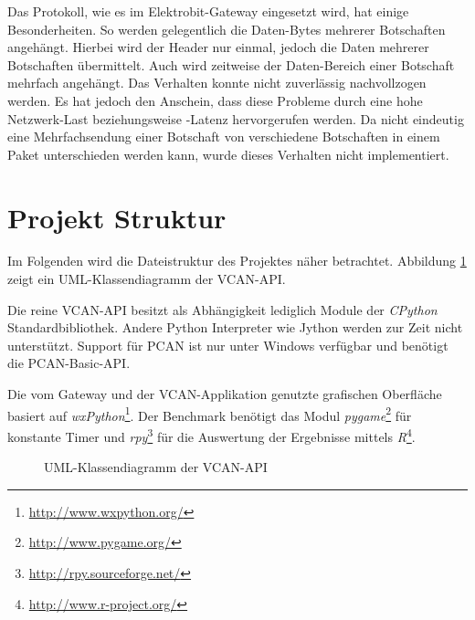 Das Protokoll, wie es im Elektrobit-Gateway eingesetzt wird, hat einige Besonderheiten. So werden gelegentlich die Daten-Bytes mehrerer Botschaften angehängt. Hierbei wird der Header nur einmal, jedoch die Daten mehrerer Botschaften übermittelt. Auch wird zeitweise der Daten-Bereich einer Botschaft mehrfach angehängt. Das Verhalten konnte nicht zuverlässig nachvollzogen werden. Es hat jedoch den Anschein, dass diese Probleme durch eine hohe Netzwerk-Last beziehungsweise -Latenz hervorgerufen werden. Da nicht eindeutig eine Mehrfachsendung einer Botschaft von verschiedene Botschaften in einem Paket unterschieden werden kann, wurde dieses Verhalten nicht implementiert. 


\section{Projekt Struktur}
\label{sec:vcan_struktur}
Im Folgenden wird die Dateistruktur des Projektes näher betrachtet. Abbildung \ref{fig:vcan_api_uml} zeigt ein UML-Klassendiagramm der VCAN-API.

Die reine VCAN-API besitzt als Abhängigkeit lediglich Module der \emph{CPython} Standardbibliothek. Andere Python Interpreter wie Jython werden zur Zeit nicht unterstützt. Support für PCAN ist nur unter Windows verfügbar und benötigt die PCAN-Basic-API.

Die vom Gateway und der VCAN-Applikation genutzte grafischen Oberfläche basiert auf \emph{wxPython}\footnote{\url{http://www.wxpython.org/}}. Der Benchmark benötigt das Modul \emph{pygame}\footnote{\url{http://www.pygame.org/}} für konstante Timer und \emph{rpy}\footnote{\url{http://rpy.sourceforge.net/}} für die Auswertung der Ergebnisse mittels \emph{R}\footnote{\url{http://www.r-project.org/}}.

\begin{figure}[ht]
    \centering
    
    \caption{UML-Klassendiagramm der VCAN-API}
    \label{fig:vcan_api_uml}
\end{figure}

